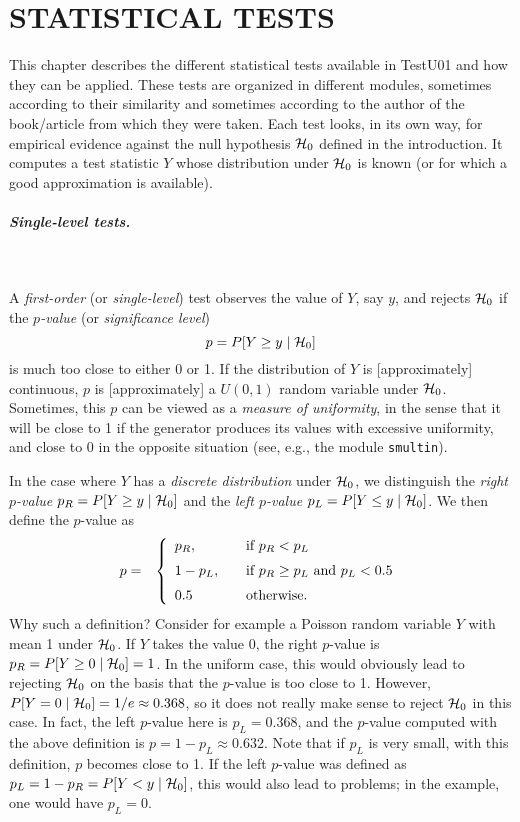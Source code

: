 \chapter{STATISTICAL TESTS}

This chapter describes the different statistical tests available 
in TestU01 and how they can be applied.
These tests are organized in different modules, 
sometimes according to their similarity and
sometimes according to the author of the book/article from which they
were taken.   
Each test looks, in its own way, for empirical evidence against 
the null hypothesis $\mathcal{H}_0$ defined in the introduction.
It computes a test statistic $Y$ whose distribution under $\mathcal{H}_0$
is known (or for which a good approximation is available).

\paragraph*{Single-level tests.} \

A {\em first-order\/} (or {\em single-level\/}) test 
observes the value of $Y$, say $y$,
and rejects $\mathcal{H}_0$ if the {\em $p$-value\/} 
(or {\em significance level\/})
 $$ p = P[Y \ge y \mid \mathcal{H}_0] $$
is much too close to either 0 or 1.
If the distribution of $Y$ is [approximately] continuous,
$p$ is [approximately]
a $U(0,1)$ random variable under $\mathcal{H}_0$.
Sometimes, this $p$ can be viewed as a {\em measure of uniformity},
in the sense that it will be close to 1 if the generator produces
its values with excessive uniformity, and close to 0 in the opposite
situation (see, e.g., the module {\tt smultin}).

In the case where $Y$ has a
 {\em discrete distribution\/}
under $\mathcal{H}_0$, we distinguish the {\em right $p$-value\/}
$p_R =  P[Y \ge y \mid \mathcal{H}_0]$ and the {\em left $p$-value\/}
$p_L =  P[Y \le y \mid \mathcal{H}_0]$.  We then define the $p$-value as
\begin{eqnarray*}
   p & = & \left\{ 
 \begin{array}{l@{\qquad}l}
      p_R, & \mbox{if } p_R <  p_L \\[6pt]
  1 - p_L, & \mbox{if } p_R \ge p_L \mbox{ and } p_L < 0.5 \\[6pt]
      0.5  &         \mbox{otherwise.}
 \end{array}\right.
\end{eqnarray*} 
Why such a definition?
Consider for example a Poisson random variable $Y$ with mean 1
under $\mathcal{H}_0$.  If $Y$ takes the value 0, the right $p$-value is
$p_R =  P[Y \ge 0 \mid \mathcal{H}_0] = 1$.  In the uniform case, this would
obviously lead to rejecting $\mathcal{H}_0$ on the basis that the 
$p$-value is too close to 1.   
However, $P[Y = 0 \mid \mathcal{H}_0] = 1/e \approx 0.368$, so it does not 
really make sense to reject $\mathcal{H}_0$ in this case.
In fact, the left $p$-value here is $p_L = 0.368$, and the $p$-value
computed with the above definition is $p = 1 - p_L \approx 0.632$.
Note that if $p_L$ is very small, with this definition, $p$ becomes
close to 1.
If the left $p$-value was defined as 
$p_L = 1 - p_R = P[Y < y \mid \mathcal{H}_0]$, this would also lead to problems;
in the example, one would have $p_L = 0$.

